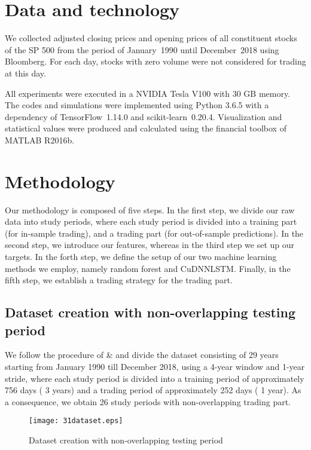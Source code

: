 \documentclass[review]{elsarticle}
\begin{document}
\section{Data and technology}\label{sec:data}

 We collected adjusted closing prices and opening prices
of all constituent stocks of the SP 500 from the period of January~1990 until December~2018 using Bloomberg. For each day, stocks with zero volume were  not considered for trading at this day.


All experiments were executed in a NVIDIA Tesla V100 with 30 GB memory. The codes and simulations were implemented using Python 3.6.5 with a dependency of 
TensorFlow~1.14.0 and scikit-learn~0.20.4.
Visualization and statistical values were produced and calculated using the financial toolbox of MATLAB R2016b. 


\section{Methodology}\label{sec:method}
Our methodology is composed of five steps. In the first step, we divide our raw data into study periods, where each study period is divided into a training part (for in-sample trading), and a trading part (for out-of-sample predictions). 
In the second step, we introduce our features, whereas 
in the third step we set up our targets. 
In the forth step, we  define the setup of our two machine learning methods we employ, namely random forest and CuDNNLSTM. 
Finally, in the fifth step, we establish a trading strategy for the trading part. 





\subsection{Dataset creation with non-overlapping testing period}

We follow the procedure of \cite{krauss17} \& \cite{krauss18} and divide the  dataset consisting of 29 years starting from January 1990 till December 2018, using a 4-year window and 1-year stride, where each study period is divided into a training period of approximately 756 days ( 3 years) and a trading period of  approximately 252 days ( 1 year). As a consequence, we obtain 26 study periods with non-overlapping trading part. 


\begin{figure}[h!]
	\centering
	
	\texttt{[image: 31dataset.eps]} \hfill
	\caption{Dataset creation with non-overlapping testing period}
	\label{fig:figure3.1.dataset}
\end{figure}
\end{document}
